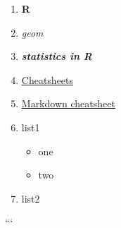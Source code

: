 \documentclass[
]{article}
\providecommand{\tightlist}{%
  \setlength{\itemsep}{0pt}\setlength{\parskip}{0pt}}
\begin{document}
\begin{enumerate}
\def\labelenumi{\arabic{enumi}.}
\item
  \textbf{R}
\item
  \emph{geom}
\item
  \textbf{\emph{statistics in R}}
\item
  \href{www.rstudio.com/resources/cheatsheets}{Cheatsheets}
\item
  \href{https://www.rstudio.com/wp-content/uploads/2015/03/rmarkdown-reference.pdf}{Markdown
  cheatsheet}
\item
  list1

  \begin{itemize}
  \tightlist
  \item
    one
  \item
    two
  \end{itemize}
\item
  list2
\end{enumerate}

```
\end{document}
